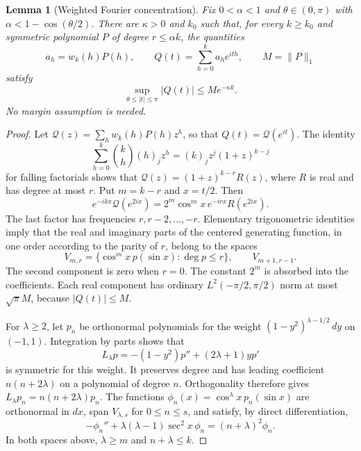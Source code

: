 \documentclass[11pt]{article}
\newtheorem{lemma}[theorem]{Lemma}
\theoremstyle{remark}\newtheorem{remark}[theorem]{Remark}
\begin{document}
\begin{lemma}[Weighted Fourier concentration]\label{lem:fourier}
Fix $0<\alpha<1$ and $\theta\in(0,\pi)$ with
$\alpha<1-\cos(\theta/2)$. There are $\kappa>0$ and $k_0$ such that,
for every $k\ge k_0$ and symmetric polynomial $P$ of degree
$r\le\alpha k$, the quantities
\[
 a_h=w_k(h)P(h),\qquad Q(t)=\sum_{h=0}^k a_h e^{ith},
 \qquad M=\|P\|_1
\]
satisfy
\begin{equation}\label{eq:fourier}
 \sup_{\theta\le|t|\le\pi}|Q(t)|\le M e^{-\kappa k}.
\end{equation}
No margin assumption is needed.
\end{lemma}
\begin{proof}
Let $\mathcal Q(z)=\sum_h w_k(h)P(h)z^h$, so that
$Q(t)=\mathcal Q(e^{it})$. The identity
\[
 \sum_{h=0}^k\binom kh(h)_jz^h=(k)_jz^j(1+z)^{k-j}
\]
for falling factorials shows that
$\mathcal Q(z)=(1+z)^{k-r}R(z)$, where $R$ is real and has degree
at most $r$. Put $m=k-r$ and $x=t/2$. Then
\[
 e^{-ikx}\mathcal Q(e^{2ix})
 =2^m\cos^m x\,e^{-irx}R(e^{2ix}).
\]
The last factor has frequencies $r,r-2,\ldots,-r$. Elementary
trigonometric identities imply that the real and imaginary parts of
the centered generating function, in one order according to the parity
of $r$, belong to the spaces
\[
 V_{m,r}=\{\cos^m x\,p(\sin x):\deg p\le r\},\qquad
 V_{m+1,r-1}.
\]
The second component is zero when $r=0$. The constant $2^m$ is
absorbed into the coefficients. Each real component has ordinary
$L^2(-\pi/2,\pi/2)$ norm at most $\sqrt\pi M$, because
$|Q(t)|\le M$.

For $\lambda\ge2$, let $p_n$ be orthonormal polynomials for the weight
$(1-y^2)^{\lambda-1/2}\,dy$ on $(-1,1)$. Integration by parts shows
that
\[
 L_\lambda p=-(1-y^2)p''+(2\lambda+1)yp'
\]
is symmetric for this weight. It preserves degree and has leading
coefficient $n(n+2\lambda)$ on a polynomial of degree $n$.
Orthogonality therefore gives $L_\lambda p_n=n(n+2\lambda)p_n$.
The functions $\phi_n(x)=\cos^\lambda x\,p_n(\sin x)$ are
orthonormal in $dx$, span $V_{\lambda,s}$ for $0\le n\le s$, and
satisfy, by direct differentiation,
\begin{equation}\label{eq:schrodinger}
 -\phi_n''+\lambda(\lambda-1)\sec^2x\,\phi_n
 =(n+\lambda)^2\phi_n.
\end{equation}
In both spaces above, $\lambda\ge m$ and $n+\lambda\le k$.


\end{proof}
\end{document}
